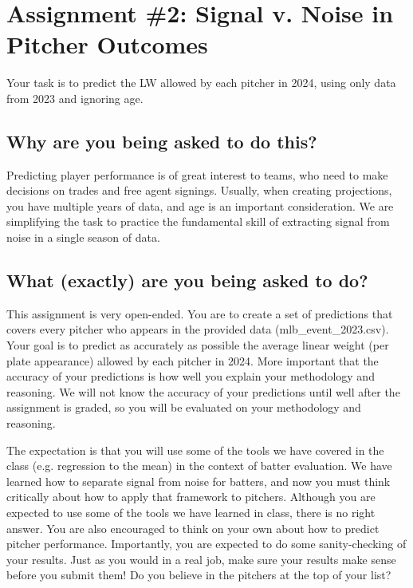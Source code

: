 \documentclass{article}
\begin{document}
  \section*{\sc Assignment \#2: Signal v. Noise in Pitcher Outcomes}

    Your task is to predict the LW allowed by each pitcher in 2024, using only data from 2023 and ignoring age.

    \subsection*{\sc Why are you being asked to do this?}

      Predicting player performance is of great interest to teams, who need to make decisions on trades and free agent signings. Usually, when creating projections, you have multiple years of data, and age is an important consideration. We are simplifying the task to practice the fundamental skill of extracting signal from noise in a single season of data.

    \subsection*{\sc What (exactly) are you being asked to do?}

      This assignment is very open-ended. You are to create a set of predictions that covers every pitcher who appears in the provided data (mlb\_event\_2023.csv). Your goal is to predict as accurately as possible the average linear weight (per plate appearance) allowed by each pitcher in 2024. More important that the accuracy of your predictions is how well you explain your methodology and reasoning. We will not know the accuracy of your predictions until well after the assignment is graded, so you will be evaluated on your methodology and reasoning.

      The expectation is that you will use some of the tools we have covered in the class (e.g. regression to the mean) in the context of batter evaluation. We have learned how to separate signal from noise for batters, and now you must think critically about how to apply that framework to pitchers. Although you are expected to use some of the tools we have learned in class, there is no right answer. You are also encouraged to think on your own about how to predict pitcher performance. Importantly, you are expected to do some sanity-checking of your results. Just as you would in a real job, make sure your results make sense before you submit them! Do you believe in the pitchers at the top of your list?
\end{document}
